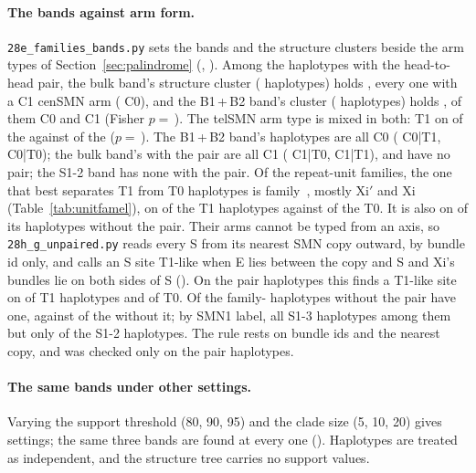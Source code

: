 \paragraph{The bands against arm form.} \texttt{28e\_families\_bands.py} sets the bands and the structure clusters beside
the arm types of Section~\ref{sec:palindrome} (, ).
Among the haplotypes with the head-to-head  pair, the bulk band's structure cluster (\afBulkClu{} haplotypes) holds
\afBulkPair, every one with a C1 cenSMN arm (\afBulkCZero{} C0), and the B1\,+\,B2 band's cluster (\afMixClu{}
haplotypes) holds \afMixPair, \afMixCZero{} of them C0 and \afMixCOne{} C1 (Fisher $p=$\,\afPC). The telSMN arm type is
mixed in both: T1 on \afBulkTOne{} of the \afBulkPair{} against \afMixTOne{} of the \afMixPair{} ($p=$\,\afP). The
B1\,+\,B2 band's \cbABn{} haplotypes are all C0 (\afABCZTOne{} C0|T1, \afABCZTZero{} C0|T0); the bulk band's
\afBulkBandPair{} with the pair are all C1 (\afBulkCOTZ{} C1|T0, \afBulkCOTO{} C1|T1), and \afBulkNoPair{} have no pair;
the S1-2 band has none with the pair. Of the repeat-unit families, the one that best separates T1 from T0 haplotypes is
family~\RU{\afSigFam}, mostly Xi$'$ and Xi (Table~\ref{tab:unitfamel}), on \afSigTOne{} of the \afTOneAll{} T1 haplotypes against
\afSigTZero{} of the \afTZeroAll{} T0. It is also on \afSigNoPair{} of its \afSigHaps{} haplotypes without the pair. Their arms cannot be typed from an axis, so \texttt{28h\_g\_unpaired.py}
reads every S from its nearest SMN copy outward, by bundle id only, and calls an S site T1-like when E lies between the
copy and S and Xi's bundles lie on both sides of S (). On the pair
haplotypes this finds a T1-like site on \gValTOne{} of \gValTOneN{} T1 haplotypes and \gValTZero{} of \gValTZeroN{} T0. Of the
\gUnpG{} family-\afSigFam{} haplotypes without the pair \gUnpGTOne{} have one, against \gUnpNoGTOne{} of the \gUnpNoG{} without it; by SMN1
label, all \gSThree{} S1-3 haplotypes among them but only \gSTwo{} of the \gSTwoN{} S1-2 haplotypes. The rule rests on bundle ids and the nearest copy, and was checked only on the pair haplotypes.

\paragraph{The same bands under other settings.} Varying the support
threshold (80, 90, 95) and the clade size (5, 10, 20) gives \mlbSettings{} settings; the same three bands are found at every
one (). Haplotypes are treated as
independent, and the structure tree carries no support values.

